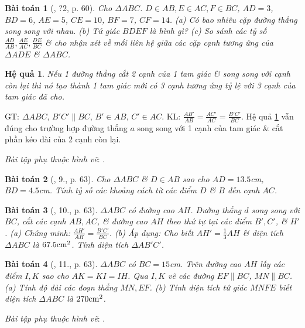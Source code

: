 \documentclass{article}
\newtheorem{baitoan}{Bài toán}
\newtheorem{hequa}{Hệ quả}
\begin{document}
\begin{baitoan}[\cite{SGK_Toan_8_tap_2}, ?2, p. 60]
	Cho $\Delta ABC$. $D\in AB,E\in AC,F\in BC$, $AD = 3$, $BD = 6$, $AE = 5$, $CE = 10$, $BF = 7$, $CF = 14$. (a) Có bao nhiêu cặp đường thẳng song song với nhau. (b) Tứ giác $BDEF$ là hình gì? (c) So sánh các tỷ số $\frac{AD}{AB},\frac{AE}{AC},\frac{DE}{BC}$ \& cho nhận xét về mối liên hệ giữa các cặp cạnh tương ứng của $\Delta ADE$ \& $\Delta ABC$.
\end{baitoan}

\begin{hequa}
	\label{col: Thales}
	Nếu 1 đường thẳng cắt 2 cạnh của 1 tam giác \& song song với cạnh còn lại thì nó tạo thành 1 tam giác mới có 3 cạnh tương ứng tỷ lệ với 3 cạnh của tam giác đã cho.
\end{hequa}
GT: $\Delta ABC$, $B'C'\parallel BC$, $B'\in AB$, $C'\in AC$. KL: $\frac{AB'}{AB} = \frac{AC'}{AC} = \frac{B'C'}{BC}$. Hệ quả \ref{col: Thales} vẫn đúng cho trường hợp đường thẳng $a$ song song với 1 cạnh của tam giác \& cắt phần kéo dài của 2 cạnh còn lại.

\textit{Bài tập phụ thuộc hình vẽ}: \cite[?3, 6.--8., pp. 62--63]{SGK_Toan_8_tap_2}.

\begin{baitoan}[\cite{SGK_Toan_8_tap_2}, 9., p. 63]
	Cho $\Delta ABC$ \& $D\in AB$ sao cho $AD = 13.5$\emph{cm}, $BD = 4.5$\emph{cm}. Tính tỷ số các khoảng cách từ các điểm $D$ \& $B$ đến cạnh $AC$.
\end{baitoan}

\begin{baitoan}[\cite{SGK_Toan_8_tap_2}, 10., p. 63]
	$\Delta ABC$ có đường cao $AH$. Đường thẳng $d$ song song với $BC$, cắt các cạnh $AB,AC$, \& đường cao $AH$ theo thứ tự tại các điểm $B',C'$, \& $H'$. (a) Chứng minh: $\frac{AH'}{AH} = \frac{B'C'}{BC}$. (b) Áp dụng: Cho biết $AH' = \frac{1}{3}AH$ \& diện tích $\Delta ABC$ là $67.5{\rm cm}^2$. Tính diện tích $\Delta AB'C'$.
\end{baitoan}

\begin{baitoan}[\cite{SGK_Toan_8_tap_2}, 11., p. 63]
	$\Delta ABC$ có $BC = 15$\emph{cm}. Trên đường cao $AH$ lấy các điểm $I,K$ sao cho $AK = KI = IH$. Qua $I,K$ vẽ các đường $EF\parallel BC$, $MN\parallel BC$. (a) Tính độ dài các đoạn thẳng $MN,EF$. (b) Tính diện tích tứ giác $MNFE$ biết diện tích $\Delta ABC$ là $270{\rm cm}^2$.
\end{baitoan}
\noindent\textit{Bài tập phụ thuộc hình vẽ}: \cite[12.--13., p. 64]{SGK_Toan_8_tap_2}.
\end{document}
